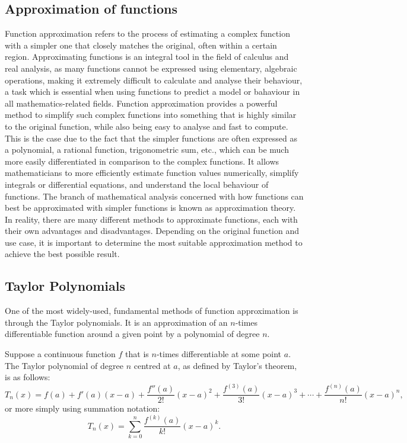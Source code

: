 \documentclass[a4paper, 12pt]{article}
\begin{document}
\subsection{Approximation of functions}
Function approximation refers to the process of estimating a complex function with a simpler one that closely matches the original, often within a certain region. Approximating functions is an integral tool in the field of calculus and real analysis, as many functions cannot be expressed using elementary, algebraic operations, making it extremely difficult to calculate and analyse their behaviour, a task which is essential when using functions to predict a model or bahaviour in all mathematics-related fields. Function approximation provides a powerful method to simplify such complex functions into something that is highly similar to the original function, while also being easy to analyse and fast to compute. This is the case due to the fact that the simpler functions are often expressed as a polynomial, a rational function, trigonometric sum, etc., which can be much more easily differentiated in comparison to the complex functions. It allows mathematicians to more efficiently estimate function values numerically, simplify integrals or differential equations, and understand the local behaviour of functions. The branch of mathematical analysis concerned with how functions can best be approximated with simpler functions is known as approximation theory. In reality, there are many different methods to approximate functions, each with their own advantages and disadvantages. Depending on the original function and use case, it is important to determine the most suitable approximation method to achieve the best possible result. 

\subsection{Taylor Polynomials}
One of the most widely-used, fundamental methods of function approximation is through the Taylor polynomials. It is an approximation of an $n$-times differentiable function around a given point by a polynomial of degree $n$. 

Suppose a continuous function $f$ that is $n$-times differentiable at some point $a$. The Taylor polynomial of degree $n$ centred at $a$, as defined by Taylor’s theorem, is as follows:
\begin{equation}
T_n(x) = f(a) + f'(a)(x-a) + \frac{f''(a)}{2!}(x-a)^2 + \frac{f^{(3)}(a)}{3!}(x-a)^3 + \cdots + \frac{f^{(n)}(a)}{n!}(x-a)^n,
\end{equation}
or more simply using summation notation:
\begin{equation}
T_n(x) = \sum_{k=0}^{n} \frac{f^{(k)}(a)}{k!}(x-a)^k .
\end{equation}
\end{document}
